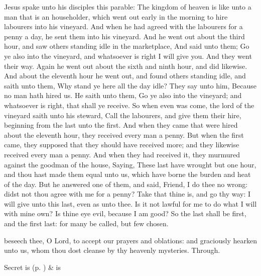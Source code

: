  Jesus spake unto his disciples this parable: The kingdom of heaven is like unto a man that is an householder, which went out early in the morning to hire labourers into his vineyard. And when he had agreed with the labourers for a penny a day, he sent them into his vineyard. And he went out about the third hour, and saw others standing idle in the marketplace, And said unto them; Go ye also into the vineyard, and whatsoever is right I will give you. And they went their way. Again he went out about the sixth and ninth hour, and did likewise. And about the eleventh hour he went out, and found others standing idle, and saith unto them, Why stand ye here all the day idle? They say unto him, Because no man hath hired us. He saith unto them, Go ye also into the vineyard; and whatsoever is right, that shall ye receive. So when even was come, the lord of the vineyard saith unto his steward, Call the labourers, and give them their hire, beginning from the last unto the first. And when they came that were hired about the eleventh hour, they received every man a penny. But when the first came, they supposed that they should have received more; and they likewise received every man a penny. And when they had received it, they murmured against the goodman of the house, Saying, These last have wrought but one hour, and thou hast made them equal unto us, which have borne the burden and heat of the day. But he answered one of them, and said, Friend, I do thee no wrong: didst not thou agree with me for a penny? Take that thine is, and go thy way: I will give unto this last, even as unto thee. Is it not lawful for me to do what I will with mine own? Is thine eye evil, because I am good? So the last shall be first, and the first last: for many be called, but few chosen.


\secret
{} beseech thee, O Lord, to accept our prayers and oblations: and graciously hearken unto us, whom thou dost cleanse by thy heavenly mysteries. Through.
\begin{rubric}
     Secret is  (p. \pageref{SPSaints}) \&  is 
\end{rubric}


